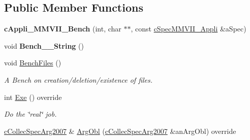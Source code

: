 \subsection*{Public Member Functions}
\begin{DoxyCompactItemize}
\item 
{\bfseries c\+Appli\+\_\+\+M\+M\+V\+I\+I\+\_\+\+Bench} (int, char $\ast$$\ast$, const \hyperlink{classMMVII_1_1cSpecMMVII__Appli}{c\+Spec\+M\+M\+V\+I\+I\+\_\+\+Appli} \&a\+Spec)\hypertarget{classMMVII_1_1cAppli__MMVII__Bench_a5a11edeb7d95961ef1d8e142c646bbbf}{}\label{classMMVII_1_1cAppli__MMVII__Bench_a5a11edeb7d95961ef1d8e142c646bbbf}

\item 
void {\bfseries Bench\+\_\+\_\+\+String} ()\hypertarget{classMMVII_1_1cAppli__MMVII__Bench_abbe8eb1c605cace1c0c5ea495d9503bf}{}\label{classMMVII_1_1cAppli__MMVII__Bench_abbe8eb1c605cace1c0c5ea495d9503bf}

\item 
void \hyperlink{classMMVII_1_1cAppli__MMVII__Bench_a023542f9ce9a3574b3c3bd4650a263f3}{Bench\+Files} ()\hypertarget{classMMVII_1_1cAppli__MMVII__Bench_a023542f9ce9a3574b3c3bd4650a263f3}{}\label{classMMVII_1_1cAppli__MMVII__Bench_a023542f9ce9a3574b3c3bd4650a263f3}

\begin{DoxyCompactList}\small\item\em A Bench on creation/deletion/existence of files. \end{DoxyCompactList}\item 
int \hyperlink{classMMVII_1_1cAppli__MMVII__Bench_a1199fd0aa557c959a56206f7d0347248}{Exe} () override\hypertarget{classMMVII_1_1cAppli__MMVII__Bench_a1199fd0aa557c959a56206f7d0347248}{}\label{classMMVII_1_1cAppli__MMVII__Bench_a1199fd0aa557c959a56206f7d0347248}

\begin{DoxyCompactList}\small\item\em Do the \char`\"{}real\char`\"{} job. \end{DoxyCompactList}\item 
\hyperlink{classMMVII_1_1cCollecSpecArg2007}{c\+Collec\+Spec\+Arg2007} \& \hyperlink{classMMVII_1_1cAppli__MMVII__Bench_a933483d77a910740e1d874eeb139eff2}{Arg\+Obl} (\hyperlink{classMMVII_1_1cCollecSpecArg2007}{c\+Collec\+Spec\+Arg2007} \&an\+Arg\+Obl) override\hypertarget{classMMVII_1_1cAppli__MMVII__Bench_a933483d77a910740e1d874eeb139eff2}{}\label{classMMVII_1_1cAppli__MMVII__Bench_a933483d77a910740e1d874eeb139eff2}


\end{DoxyCompactItemize}
